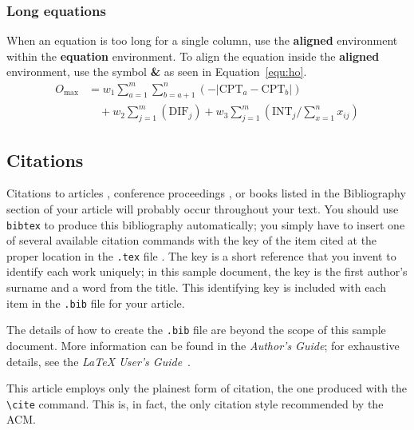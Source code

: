 \documentclass[sigconf]{acmart}
\begin{document}
\subsubsection{Long equations}

When an equation is too long for a single column, use the \textbf{aligned}
environment within the \textbf{equation} environment.  To align the equation
inside the \textbf{aligned} environment, use the symbol \textbf{\&} as seen in
Equation~\ref{equ:ho}.
%
\begin{equation}
    \begin{aligned}
        O_{\max}& = w_1 \sum_{a=1}^{m} \sum_{b=a+1}^{n} (-\lvert\text{CPT}_a 
        -\text{CPT}_b\rvert)\\ 
        &\quad + w_2 \sum_{j=1}^{m} (\text{DIF}_j) + w_3 \sum_{j=1}^{m} 
        (\text{INT}_j/\sum_{x=1}^{n} x_{ij})
    \end{aligned}
    \label{equ:ho}
\end{equation}

\subsection{Citations}

Citations to articles \cite{lecun2015deep, braams:babel, herlihy:methodology},
conference proceedings \cite{vrbancic2019transfer, clark:pct}, or books
\cite{salas:calculus, Lamport:LaTeX, fister2019computational} listed in the
Bibliography section of your article will probably occur throughout your text.
You should use \texttt{bibtex} to produce this bibliography automatically; you
simply have to insert one of several available citation commands with the key
of the item cited at the proper location in the \texttt{.tex} file
\cite{Lamport:LaTeX}.  The key is a short reference that you invent to
identify each work uniquely; in this sample document, the key is the first
author's surname and a word from the title.  This identifying key is included
with each item in the \texttt{.bib} file for your article.

The details of how to create the \texttt{.bib} file are beyond the scope of
this sample document.  More information can be found in the \emph{Author's
Guide}; for exhaustive details, see the \emph{\LaTeX{} User's
Guide}~\cite{Lamport:LaTeX}.

This article employs only the plainest form of citation, the one produced with
the \texttt{\textbackslash{}cite} command.  This is, in fact, the only
citation style recommended by the ACM.
\end{document}
